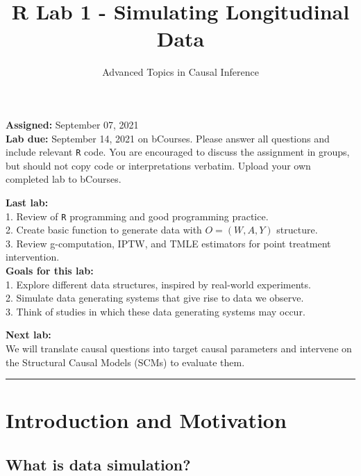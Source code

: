 \documentclass[answers]{exam}
\title{R Lab 1 - Simulating Longitudinal Data}
\author{Advanced Topics in Causal Inference}
\date{}
\begin{document}
\maketitle



\maketitle
\noindent \textbf{Assigned:} September 07, 2021\\
\textbf{Lab due:} September 14, 2021 on bCourses. Please answer all questions and include relevant \texttt{R} code. You are encouraged to discuss the assignment in groups, but should not copy code or interpretations verbatim. Upload your own completed lab to bCourses.



\noindent \textbf{Last lab:} \\ 
1. Review of \texttt{R} programming and good programming practice. \\
2. Create basic function to generate data with $O = (W, A, Y)$ structure. \\
3. Review g-computation, IPTW, and TMLE estimators for point treatment intervention. \\


\noindent \textbf{Goals for this lab:} \\
1. Explore different data structures, inspired by real-world experiments. \\
2. Simulate data generating systems that give rise to data we observe. \\
3. Think of studies in which these data generating systems may occur.


\noindent \textbf{Next lab:}\\
We will translate causal questions into target causal parameters and intervene on the Structural Causal Models (SCMs) to evaluate them. 

\begin{center}
\noindent\rule{18cm}{0.4pt}
\end{center}

\section{Introduction and Motivation}

\subsection{What is data simulation?}
\end{document}
